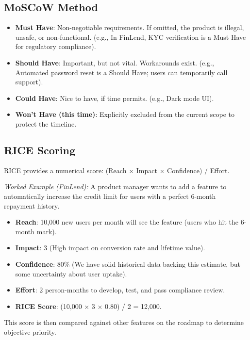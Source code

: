 \subsection{MoSCoW Method}\label{moscow-method}

\begin{itemize}
\tightlist
\item
  \textbf{Must Have}: Non-negotiable requirements. If omitted, the
  product is illegal, unsafe, or non-functional. (e.g., In FinLend, KYC
  verification is a Must Have for regulatory compliance).
\item
  \textbf{Should Have}: Important, but not vital. Workarounds exist.
  (e.g., Automated password reset is a Should Have; users can
  temporarily call support).
\item
  \textbf{Could Have}: Nice to have, if time permits. (e.g., Dark mode
  UI).
\item
  \textbf{Won't Have (this time)}: Explicitly excluded from the current
  scope to protect the timeline.
\end{itemize}

\subsection{RICE Scoring}\label{rice-scoring}

RICE provides a numerical score: (Reach \(\times\) Impact \(\times\)
Confidence) / Effort.

\emph{Worked Example (FinLend):} A product manager wants to add a
feature to automatically increase the credit limit for users with a
perfect 6-month repayment history.

\begin{itemize}
\tightlist
\item
  \textbf{Reach}: 10,000 new users per month will see the feature (users
  who hit the 6-month mark).
\item
  \textbf{Impact}: 3 (High impact on conversion rate and lifetime
  value).
\item
  \textbf{Confidence}: 80\% (We have solid historical data backing this
  estimate, but some uncertainty about user uptake).
\item
  \textbf{Effort}: 2 person-months to develop, test, and pass compliance
  review.
\item
  \textbf{RICE Score}: (10,000 \(\times\) 3 \(\times\) 0.80) / 2 =
  12,000.
\end{itemize}

This score is then compared against other features on the roadmap to
determine objective priority.

